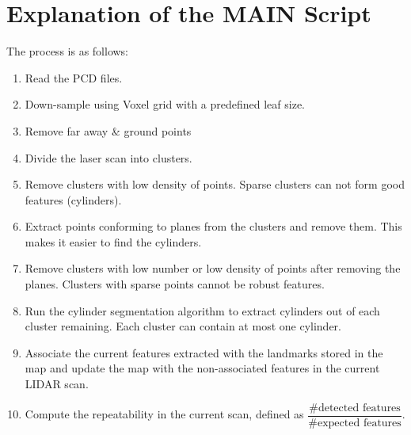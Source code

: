 \documentclass[twoside]{article}
\begin{document}
\section{Explanation of the MAIN Script}
The process is as follows:
\begin{enumerate}
	\item Read the PCD files.
	\item Down-sample using Voxel grid with a predefined leaf size.
	\item Remove far away \& ground points
	\item Divide the laser scan into clusters.
	\item Remove clusters with low density of points. Sparse clusters can not form good features (cylinders).
	\item Extract points conforming to planes from the clusters and remove them. This makes it easier to find the cylinders.
	\item Remove clusters with low number or low density of points after removing the planes. Clusters with sparse points cannot be robust features.
	\item Run the cylinder segmentation algorithm to extract cylinders out of each cluster remaining. Each cluster can contain at most one cylinder.
	\item Associate the current features extracted with the landmarks stored in the map and update the map with the non-associated features in the current LIDAR scan.
	\item Compute the repeatability in the current scan, defined as $\dfrac{\text{\#detected features}}{\text{\#expected features}}$.
\end{enumerate}
\end{document}
